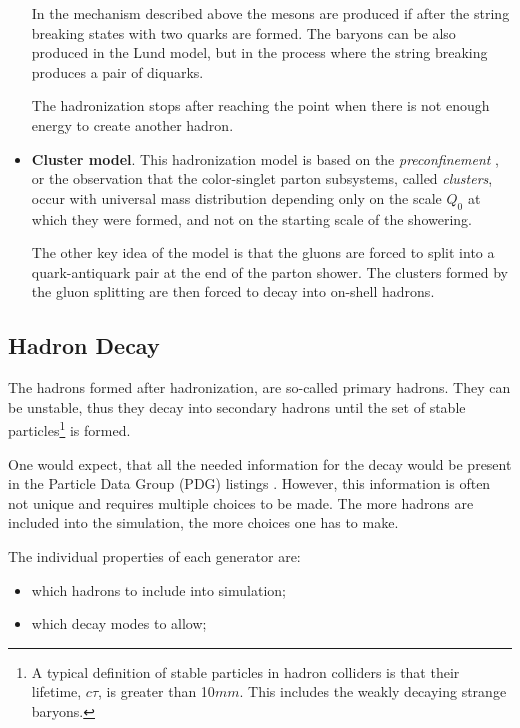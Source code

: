 \begin{itemize}
 In the mechanism described above the mesons are produced if after the string breaking states with two quarks are formed. 
 The baryons can be also produced in the Lund model, but in the process where the string breaking produces a pair of diquarks.
 
 The hadronization stops after reaching the point when there is not enough energy to create another hadron.
 
 \item \textbf{Cluster model}. This hadronization model is based on the \textit{preconfinement} \cite{Amati:1979fg}, or the
 observation that the color-singlet parton subsystems, called \textit{clusters}, occur with universal mass distribution
 depending only on the scale $Q_{0}$ at which they were formed, and not on the starting scale of the showering.
 
 The other key idea of the model is that the gluons are forced to split into a quark-antiquark pair at the end of the parton shower.
 The clusters formed by the gluon splitting are then forced to decay into on-shell hadrons.
 
\end{itemize}

\subsection{Hadron Decay}

The hadrons formed after hadronization, are so-called primary hadrons. They can be unstable, thus they decay into secondary hadrons
until the set of stable particles\footnote{A typical definition of stable particles in hadron colliders is that their
lifetime, $c\tau$, is greater than 10$mm$. This includes the weakly decaying strange baryons.} is formed.

One would expect, that all the needed information for the decay would be present in the Particle Data Group (PDG) listings \cite{PDG-2012}.
However, this information is often not unique and requires multiple choices to be made. The more hadrons are included into the simulation,
the more choices one has to make.

The individual properties of each generator are:

\begin{itemize}
 \item which hadrons to include into simulation;
 \item which decay modes to allow;
\end{itemize}

